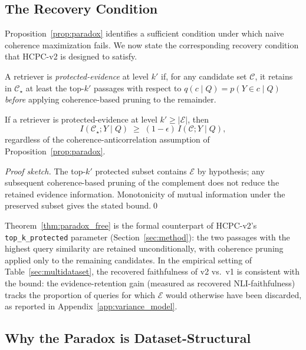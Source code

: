 \subsection{The Recovery Condition}
\label{sec:theory:recovery}

Proposition~\ref{prop:paradox} identifies a sufficient condition under
which naive coherence maximization fails.  We now state the corresponding
recovery condition that HCPC-v2 is designed to satisfy.

\begin{definition}
\label{def:protected}
A retriever is \emph{protected-evidence} at level $k'$ if, for any
candidate set $\mathcal{C}$, it retains in $\mathcal{C}_\star$ at least the
top-$k'$ passages with respect to
$q(c \mid Q) = p(Y \in c \mid Q)$ \emph{before} applying coherence-based
pruning to the remainder.
\end{definition}

\begin{theorem}
\label{thm:paradox_free}
If a retriever is protected-evidence at level
$k' \geq |\mathcal{E}|$, then
\[
  I(\mathcal{C}_\star; Y \mid Q)
  \;\geq\;
  (1 - \epsilon)\, I(\mathcal{C}; Y \mid Q),
\]
regardless of the coherence-anticorrelation assumption of
Proposition~\ref{prop:paradox}.
\end{theorem}

\begin{proof}[Proof sketch]
The top-$k'$ protected subset contains $\mathcal{E}$ by hypothesis; any
subsequent coherence-based pruning of the complement does not reduce the
retained evidence information.  Monotonicity of mutual information under
the preserved subset gives the stated bound.\qed
\end{proof}

Theorem~\ref{thm:paradox_free} is the formal counterpart of HCPC-v2's
\texttt{top\_k\_protected} parameter (Section~\ref{sec:method}):
the two passages with the highest query similarity are retained
unconditionally, with coherence pruning applied only to the remaining
candidates.  In the empirical setting of Table~\ref{sec:multidataset}, the
recovered faithfulness of v2 vs.\ v1 is consistent with the bound: the
evidence-retention gain (measured as recovered NLI-faithfulness) tracks
the proportion of queries for which $\mathcal{E}$ would otherwise have
been discarded, as reported in Appendix~\ref{app:variance_model}.

\subsection{Why the Paradox is Dataset-Structural}

